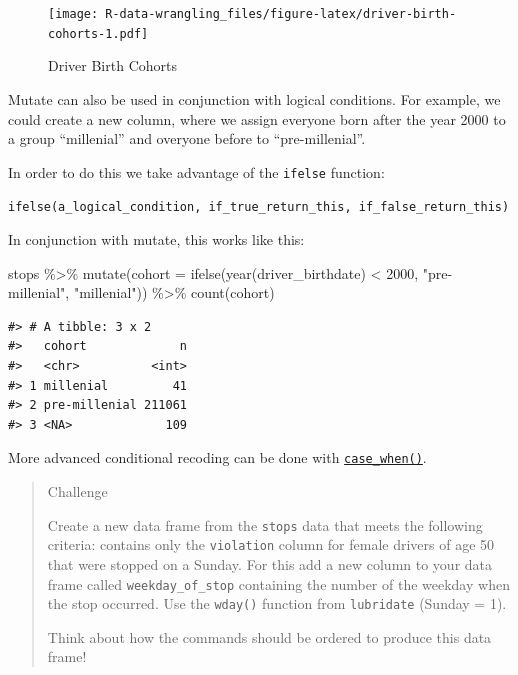 \documentclass[
]{book}
\newenvironment{Shaded}{\begin{snugshade}}{\end{snugshade}}
\newcommand{\AttributeTok}[1]{\textcolor[rgb]{0.77,0.63,0.00}{#1}}
\newcommand{\DecValTok}[1]{\textcolor[rgb]{0.00,0.00,0.81}{#1}}
\newcommand{\FunctionTok}[1]{\textcolor[rgb]{0.00,0.00,0.00}{#1}}
\newcommand{\NormalTok}[1]{#1}
\newcommand{\SpecialCharTok}[1]{\textcolor[rgb]{0.00,0.00,0.00}{#1}}
\newcommand{\StringTok}[1]{\textcolor[rgb]{0.31,0.60,0.02}{#1}}
\begin{document}
\begin{figure}
\centering
\texttt{[image: R-data-wrangling\_files/figure-latex/driver-birth-cohorts-1.pdf]}
\caption{\label{fig:driver-birth-cohorts}Driver Birth Cohorts}
\end{figure}

Mutate can also be used in conjunction with logical conditions. For example, we could create a new column, where we assign everyone born after the year 2000 to a group ``millenial'' and overyone before to ``pre-millenial''.

In order to do this we take advantage of the \texttt{ifelse} function:

\texttt{ifelse(a\_logical\_condition,\ if\_true\_return\_this,\ if\_false\_return\_this)}

In conjunction with mutate, this works like this:

\begin{Shaded}
\begin{Highlighting}[]
\NormalTok{stops }\SpecialCharTok{\%\textgreater{}\%} 
  \FunctionTok{mutate}\NormalTok{(}\AttributeTok{cohort =} \FunctionTok{ifelse}\NormalTok{(}\FunctionTok{year}\NormalTok{(driver\_birthdate) }\SpecialCharTok{\textless{}} \DecValTok{2000}\NormalTok{, }\StringTok{"pre{-}millenial"}\NormalTok{, }\StringTok{"millenial"}\NormalTok{)) }\SpecialCharTok{\%\textgreater{}\%} 
  \FunctionTok{count}\NormalTok{(cohort)}
\end{Highlighting}
\end{Shaded}

\begin{verbatim}
#> # A tibble: 3 x 2
#>   cohort             n
#>   <chr>          <int>
#> 1 millenial         41
#> 2 pre-millenial 211061
#> 3 <NA>             109
\end{verbatim}

More advanced conditional recoding can be done with \href{https://dplyr.tidyverse.org/reference/case_when.html}{\texttt{case\_when()}}.

\begin{quote}
Challenge

Create a new data frame from the \texttt{stops} data that meets the following
criteria: contains only the \texttt{violation} column for female drivers of age 50 that were stopped on a Sunday. For this add a new column to your data frame called
\texttt{weekday\_of\_stop} containing the number of the weekday when the stop occurred. Use the \texttt{wday()} function from \texttt{lubridate} (Sunday = 1).

Think about how the commands should be ordered to produce this data frame!
\end{quote}
\end{document}
